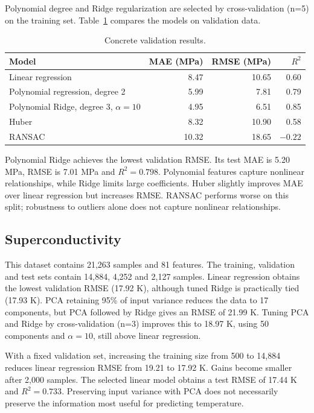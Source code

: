 \documentclass[11pt,a4paper]{article}
\begin{document}
Polynomial degree and Ridge regularization are selected by cross-validation (n=5) on the training set. Table~\ref{tab:concrete} compares the models
on validation data.

\begin{table}[ht]
\centering
\small
\caption{Concrete validation results.}
\label{tab:concrete}
\begin{tabular}{lrrr}
\toprule
Model & MAE (MPa) & RMSE (MPa) & $R^2$\\
\midrule
Linear regression & 8.47 & 10.65 & 0.60\\
Polynomial regression, degree 2 & 5.99 & 7.81 & 0.79\\
Polynomial Ridge, degree 3, $\alpha=10$ & 4.95 & 6.51 & 0.85\\
Huber & 8.32 & 10.90 & 0.58\\
RANSAC & 10.32 & 18.65 & $-0.22$\\
\bottomrule
\end{tabular}
\end{table}

Polynomial Ridge achieves the lowest validation RMSE. Its test MAE is
5.20 MPa, RMSE is 7.01 MPa and $R^2=0.798$.
Polynomial features capture nonlinear relationships, while Ridge limits large
coefficients. Huber slightly improves MAE over linear regression but increases
RMSE. RANSAC performs worse on this split; robustness to outliers alone does not
capture nonlinear relationships.

\subsection{Superconductivity}
This dataset contains 21,263 samples and 81 features. The training, validation and
test sets contain 14,884, 4,252 and 2,127 samples. Linear regression obtains the
lowest validation RMSE (17.92 K), although tuned Ridge is practically tied
(17.93 K). PCA retaining 95\% of input variance reduces the data to 17 components,
but PCA followed by Ridge gives an RMSE of 21.99 K. Tuning PCA and Ridge by cross-validation (n=3) improves this to 18.97 K, using 50 components and
$\alpha=10$, still above linear regression.

With a fixed validation set, increasing the training size from 500 to 14,884
reduces linear regression RMSE from 19.21 to 17.92 K. Gains become smaller after
2,000 samples. The selected linear model obtains a test RMSE of
17.44 K and $R^2=0.733$. Preserving input variance with PCA does not
necessarily preserve the information most useful for predicting temperature.
\end{document}
